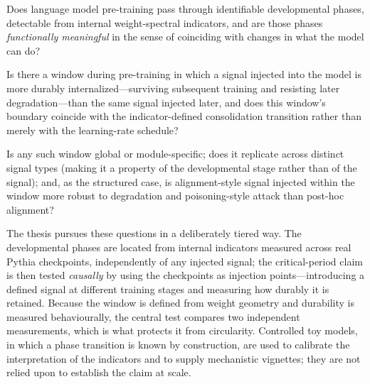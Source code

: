 \begin{researchquestion}[Phases]
\label{rq:phases}
Does language model pre-training pass through identifiable developmental phases, detectable
from internal weight-spectral indicators, and are those phases \emph{functionally meaningful}
in the sense of coinciding with changes in what the model can do?
\end{researchquestion}

\begin{researchquestion}
\label{rq:critical}
Is there a window during pre-training in which a signal injected into the model is more durably
internalized---surviving subsequent training and resisting later degradation---than the same
signal injected later, and does this window's boundary coincide with the indicator-defined
consolidation transition rather than merely with the learning-rate schedule?
\end{researchquestion}

\begin{researchquestion}
\label{rq:structure}
Is any such window global or module-specific; does it replicate across distinct signal types
(making it a property of the developmental stage rather than of the signal); and, as the
structured case, is alignment-style signal injected within the window more robust to
degradation and poisoning-style attack than post-hoc alignment?
\end{researchquestion}

The thesis pursues these questions in a deliberately tiered way. The developmental phases are
located from internal indicators measured across real Pythia checkpoints, independently of any
injected signal; the critical-period claim is then tested \emph{causally} by using the
checkpoints as injection points---introducing a defined signal at different training stages and
measuring how durably it is retained. Because the window is defined from weight geometry and
durability is measured behaviourally, the central test compares two independent measurements,
which is what protects it from circularity. Controlled toy models, in which a phase transition
is known by construction, are used to calibrate the interpretation of the indicators and to
supply mechanistic vignettes; they are not relied upon to establish the claim at scale.

